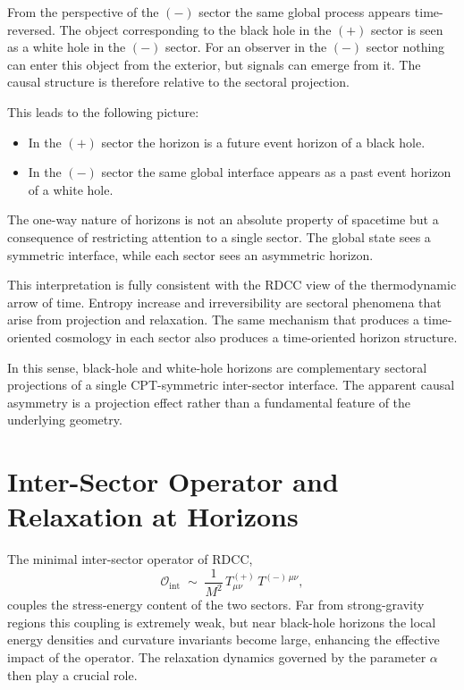 \documentclass[11pt,a4paper]{article}
\begin{document}
From the perspective of the $(-)$ sector the same global process appears time-reversed.
The object corresponding to the black hole in the $(+)$ sector is seen as a white hole in
the $(-)$ sector. For an observer in the $(-)$ sector nothing can enter this object from the
exterior, but signals can emerge from it. The causal structure is therefore relative to the
sectoral projection.

This leads to the following picture:

\begin{itemize}
\item In the $(+)$ sector the horizon is a future event horizon of a black hole.
\item In the $(-)$ sector the same global interface appears as a past event horizon of a white hole.
\end{itemize}

The one-way nature of horizons is not an absolute property of spacetime but a consequence
of restricting attention to a single sector. The global state sees a symmetric interface,
while each sector sees an asymmetric horizon.

This interpretation is fully consistent with the RDCC view of the thermodynamic arrow
of time. Entropy increase and irreversibility are sectoral phenomena that arise from
projection and relaxation. The same mechanism that produces a time-oriented cosmology
in each sector also produces a time-oriented horizon structure.

In this sense, black-hole and white-hole horizons are complementary sectoral projections
of a single CPT-symmetric inter-sector interface. The apparent causal asymmetry is a
projection effect rather than a fundamental feature of the underlying geometry.


\section{Inter-Sector Operator and Relaxation at Horizons}

The minimal inter-sector operator of RDCC,
\begin{equation}
\mathcal{O}_{\mathrm{int}}
\;\sim\;
\frac{1}{M^{2}}
\,T^{(+)}_{\mu\nu}\,T^{(-)\,\mu\nu},
\end{equation}
couples the stress-energy content of the two sectors. Far from strong-gravity regions this
coupling is extremely weak, but near black-hole horizons the local energy densities and
curvature invariants become large, enhancing the effective impact of the operator. The
relaxation dynamics governed by the parameter $\alpha$ then play a crucial role.
\end{document}
